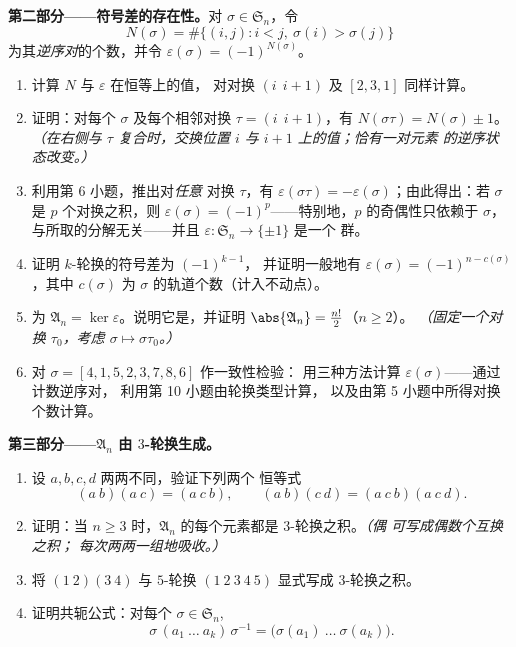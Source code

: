 \begin{problem}
\medskip
\noindent\textbf{第二部分——符号差的存在性。}对 $\sigma
\in \mathfrak S_n$，令
\[
N(\sigma) = \#\bigl\{(i, j) : i < j,\ \sigma(i) >
\sigma(j)\bigr\}
\]
为其\emph{逆序对}的个数，并令 $\varepsilon(\sigma) =
(-1)^{N(\sigma)}$。
\begin{enumerate}[resume]
  \item 计算 $N$ 与 $\varepsilon$ 在恒等上的值，
        对对换 $(i\ \ i{+}1)$ 及 $[2, 3, 1]$ 同样计算。
  \item 证明：对每个 $\sigma$ 及每个相邻对换
        $\tau = (i\ \ i{+}1)$，有
        $N(\sigma\tau) = N(\sigma) \pm 1$。\emph{（在右侧与
        $\tau$ 复合时，交换位置 $i$ 与
        $i + 1$ 上的值；恰有一对元素
        的逆序状态改变。）}
  \item 利用第 6 小题，推出对\emph{任意}
        对换 $\tau$，有 $\varepsilon(\sigma\tau) =
        -\varepsilon(\sigma)$；由此得出：若 $\sigma$ 是
        $p$ 个对换之积，则 $\varepsilon(\sigma)
        = (-1)^p$——特别地，$p$ 的奇偶性只依赖于
        $\sigma$，与所取的分解无关——并且
        $\varepsilon \colon \mathfrak S_n \to \{\pm 1\}$ 是一个
        群。
  \item 证明 $k$-轮换的符号差为 $(-1)^{k-1}$，
        并证明一般地有 $\varepsilon(\sigma) = (-1)^{n -
        c(\sigma)}$，其中 $c(\sigma)$ 为
        $\sigma$ 的轨道个数（计入不动点）。
  \item \emph{}为 $\mathfrak A_n =
        \ker\varepsilon$。说明它是，并证明
        $\abs{\mathfrak A_n} = \frac{n!}2$（$n \geq 2$）。
        \emph{（固定一个对换 $\tau_0$，考虑 $\sigma
        \mapsto \sigma\tau_0$。）}
  \item 对 $\sigma = [4, 1, 5, 2, 3, 7, 8, 6]$ 作一致性检验：
        用三种方法计算 $\varepsilon(\sigma)$——通过计数逆序对，
        利用第 10 小题由轮换类型计算，
        以及由第 5 小题中所得对换个数计算。
\end{enumerate}

\medskip
\noindent\textbf{第三部分——$\mathfrak A_n$ 由
$3$-轮换生成。}
\begin{enumerate}[resume]
  \item 设 $a, b, c, d$ 两两不同，验证下列两个
        恒等式
        \[
        (a\ b)(a\ c) = (a\ c\ b),
        \qquad
        (a\ b)(c\ d) = (a\ c\ b)(a\ c\ d) .
        \]
  \item 证明：当 $n \geq 3$ 时，$\mathfrak
        A_n$ 的每个元素都是 $3$-轮换之积。\emph{（偶
        可写成偶数个互换之积；
        每次两两一组地吸收。）}
  \item 将 $(1\ 2)(3\ 4)$ 与 $5$-轮换 $(1\ 2\ 3\ 4\ 5)$
        显式写成 $3$-轮换之积。
  \item 证明共轭公式：对每个 $\sigma \in
        \mathfrak S_n$,
        \[
        \sigma\,(a_1\ \dots\ a_k)\,\sigma^{-1}
        = \bigl(\sigma(a_1)\ \dots\ \sigma(a_k)\bigr) .
        \]
\end{enumerate}


\end{problem}
